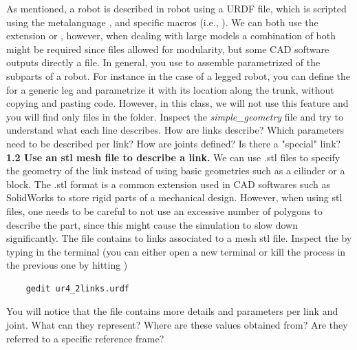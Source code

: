 \documentclass[11pt]{article}
\begin{document}
As mentioned, a robot is described in robot using a URDF file, which is scripted using the metalanguage , and specific  macros (i.e., ). We can both use the extension  or , however, when dealing with large models a combination of both might be required since  files allowed for modularity, but some CAD software outputs directly a  file. In general, you use   to assemble  parametrized   of the subparts of a robot. For instance in the case of a legged robot, you can define the   for a generic leg and parametrize it with its location along the trunk, without copying and pasting code. However, in this class, we will not use this feature and you will find only  files in the folder. 
Inspect the \textit{simple\_geometry} file and try to understand what each line describes. How are links describe? Which parameters need to be described per link? How are joints defined? Is there a "special" link?\\




\textbf{1.2 Use an stl mesh file to describe a link.} We can use .stl files to specify the geometry of the link instead of using basic geometries such as a cilinder or a block. The .stl format is a common extension used in CAD softwares such as SolidWorks to store rigid parts of a mechanical design. However, when using stl files, one needs to be careful to not use an excessive number of polygons to describe the part, since this might cause the simulation to slow down significantly. The file  contains to links associated to a mesh stl file. Inspect the  by typing in the terminal (you can either open a new terminal or kill the process in the previous one by hitting )
%
\begin{verbatim}
	gedit ur4_2links.urdf
\end{verbatim}
%
You will notice that the file contains more details and parameters per link and joint. What can they represent? Where are these values obtained from? Are they referred to a specific reference frame?\\
\end{document}
